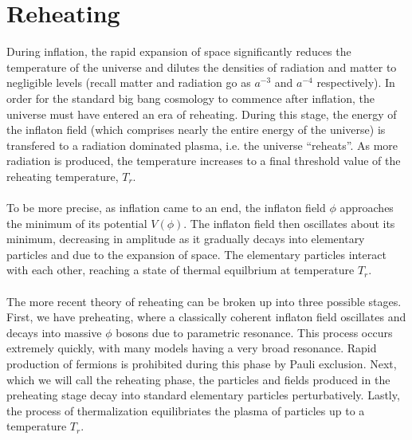 \documentclass[10pt,letterpaper]{article}
\begin{document}
\section{Reheating}
During inflation, the rapid expansion of space significantly reduces the temperature of the universe and dilutes the densities of radiation and matter to negligible levels (recall matter and radiation go as $a^{-3}$ and $a^{-4}$ respectively). In order for the standard big bang cosmology to commence after inflation, the universe must have entered an era of reheating. During this stage, the energy of the inflaton field (which comprises nearly the entire energy of the universe) is transfered to a radiation dominated plasma, i.e. the universe ``reheats''. As more radiation is produced, the temperature increases to a final threshold value of the reheating temperature, $T_r$. 
\\ \\
To be more precise, as inflation came to an end, the inflaton field $\phi$ approaches the minimum of its potential $V(\phi)$. The inflaton field then oscillates about its minimum, decreasing in amplitude as it gradually decays into elementary particles and due to the expansion of space. The elementary particles interact with each other, reaching a state of thermal equilbrium at temperature $T_r$. 
\\ \\
The more recent theory of reheating can be broken up into three possible stages. First, we have preheating, where a classically coherent inflaton field oscillates and decays into massive $\phi$ bosons due to parametric resonance. This process occurs extremely quickly, with many models having a very broad resonance. Rapid production of fermions is prohibited during this phase by Pauli exclusion. Next, which we will call the reheating phase, the particles and fields produced in the preheating stage decay into standard elementary particles perturbatively. Lastly, the process of thermalization equilibriates the plasma of particles up to a temperature $T_r$. 
\end{document}
